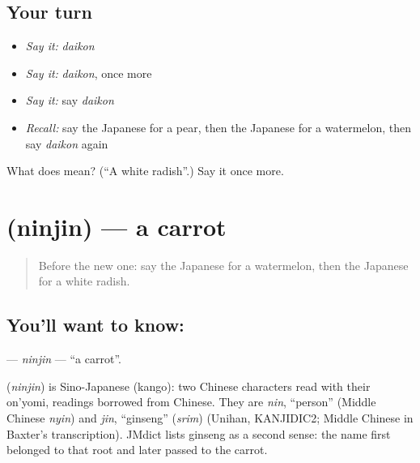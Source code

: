 \subsection*{Your turn}
\begin{itemize}
\raggedright
  \item \emph{Say it:} \emph{daikon}
  \item \emph{Say it:} \emph{daikon}, once more
  \item \emph{Say it:} say \emph{daikon}
  \item \emph{Recall:} say the Japanese for a pear, then the Japanese for a watermelon, then say \emph{daikon} again
\end{itemize}

\begin{tcolorbox}[breakable,colback=teal!4,colframe=teal!35!black,title={Before you move on}]
What does  mean? (\textquotedblleft{}A white radish\textquotedblright{}.) Say it once more.
\end{tcolorbox}
\section[\texorpdfstring{\ja{にんじん} (ninjin)}{にんじん (ninjin)}]{ (ninjin) — a carrot}

\label{lesson:JA-C34-ninjin}



\begin{quote}
Before the new one: say the Japanese for a watermelon, then the Japanese for a white radish.
\end{quote}

\subsection*{You'll want to know: }
\textbf{} — \emph{ninjin} — \textquotedblleft{}a carrot\textquotedblright{}.

\begin{cousinweb}
\textbf{} (\emph{ninjin}) is Sino-Japanese (kango): two Chinese characters read with their on'yomi, readings borrowed from Chinese. They are \emph{nin}, \textquotedblleft{}person\textquotedblright{} (Middle Chinese \emph{nyin}) and \emph{jin}, \textquotedblleft{}ginseng\textquotedblright{} (\emph{srim}) (Unihan, KANJIDIC2; Middle Chinese in Baxter's transcription). JMdict lists ginseng as a second sense: the name first belonged to that root and later passed to the carrot.
\end{cousinweb}

